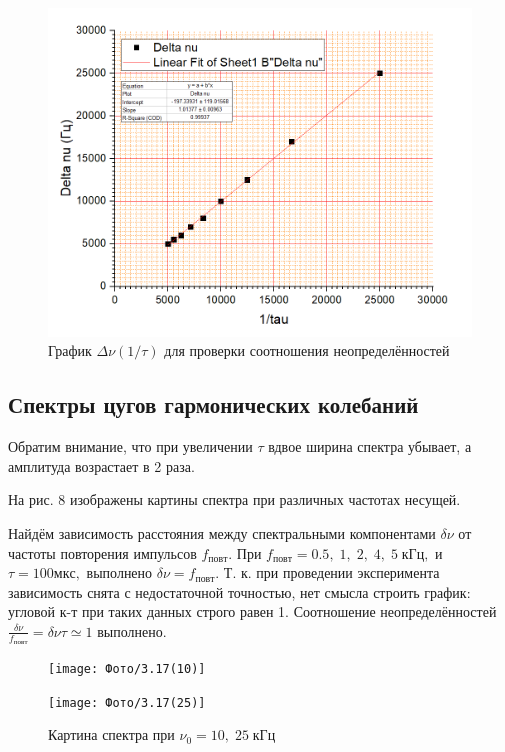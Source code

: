 \documentclass[a4paper]{article}
\begin{document}
\begin{figure}[tb]
	\centering
	\includegraphics[width=0.8\linewidth]{неопр}
	\caption{График $\Delta \nu (1/\tau)$ для проверки соотношения неопределённостей}
	\label{fig:неопр}
\end{figure}

\subsection{Спектры цугов гармонических  колебаний}

Обратим внимание, что  при увеличении $ \tau $ вдвое ширина спектра убывает, а амплитуда возрастает в 2 раза.

На рис. 8 изображены картины спектра при различных частотах несущей.

Найдём зависимость расстояния между спектральными компонентами $ \delta \nu $ от частоты повторения импульсов $ f_{повт} $. При $f_{повт}  = 0.5, \; 1, \; 2, \; 4, \; 5\; кГц, $ и $ \tau = 100 мкс,  $ выполнено $ \delta \nu = f_{повт}$. Т. к. при проведении эксперимента зависимость снята с недостаточной точностью, нет смысла строить график: угловой к-т при таких данных строго равен 1. Соотношение неопределённостей $ \frac{\delta \nu }{f_{повт}} = \delta \nu \tau  \simeq 1$ выполнено.



\begin{figure}[tbp]
	\centering
	\begin{minipage}{0.8\linewidth}
		\centering
		\texttt{[image: Фото/3.17(10)]}
	\end{minipage}
	\vspace{20pt}	
	
	\begin{minipage}{0.8\linewidth}
		\centering
		\texttt{[image: Фото/3.17(25)]}
	\end{minipage}
	\vspace{20pt}
	\label{fig:specr}
	\caption{Картина спектра при $ \nu_0 = 10, \; 25 \;  кГц $}
\end{figure}
\end{document}
